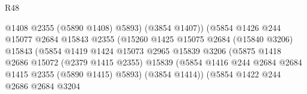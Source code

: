 \begin{lexlean}{R48}
\begin{coremodule}
                                              @1408
                                              @2355
                                              (@5890 @1408)
                                              @5893)
                                            (@3854 @1407))
                                          (@5854
                                            @1426
                                            @244
                                            @15077
                                            @2684
                                            @15843
                                            @2355
                                            (@15260
                                              @1425
                                              @15075
                                              @2684
                                              (@15840 @3206)
                                              @15843
                                              (@5854
                                                @1419
                                                @1424
                                                @15073
                                                @2965
                                                @15839
                                                @3206
                                                (@5875
                                                  @1418
                                                  @2686
                                                  @15072
                                                  (@2379 @1415 @2355)
                                                  @15839
                                                  (@5854
                                                    @1416
                                                    @244
                                                    @2684
                                                    @2684
                                                    @1415
                                                    @2355
                                                    (@5890 @1415)
                                                    @5893)
                                                  (@3854 @1414))
                                                (@5854
                                                  @1422
                                                  @244
                                                  @2686
                                                  @2684
                                                  @3204

\end{coremodule}
\end{lexlean}

